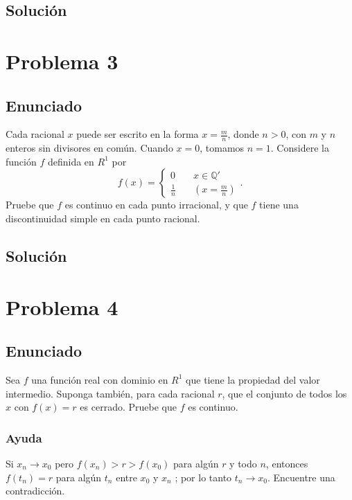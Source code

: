 \documentclass{report}
\begin{document}
\section{Solución}


\chapter{Problema 3}
\section{Enunciado}
Cada racional $x$ puede ser escrito en la forma $x = \frac{m}{n}$, donde $n > 0$, con $m$ y $n$ enteros sin divisores en común. Cuando $x = 0$, tomamos $n = 1$. Considere la función $f$ definida en $R^{1}$ por \[
f(x) =
\begin{cases}
  0&\quad x\in \mathbb{Q}'\\
  \frac{1}{n}&\quad \left( x = \frac{m}{n} \right) 
\end{cases}
.\] Pruebe que $f$ es continuo en cada punto irracional, y que $f$ tiene una discontinuidad simple en cada punto racional.
\section{Solución}



\chapter{Problema 4}
\section{Enunciado}


Sea $f$ una función real con dominio en $R^{1}$ que tiene la propiedad del valor intermedio. Suponga también, para cada racional $r$, que el conjunto de todos los $x$ con $f(x)=r$ es cerrado. Pruebe que $f$ es continuo.

\subsection{Ayuda}
Si $x_n \to x_0$ pero $f\left( x_n \right) > r > f\left( x_0 \right) $ para algún $r$ y todo $n$, entonces  $f\left( t_n \right) = r$ para algún $t_n$ entre $x_0$ y $x_n$ ; por lo tanto $t_n \to  x_0$. Encuentre una contradicción.
\end{document}
